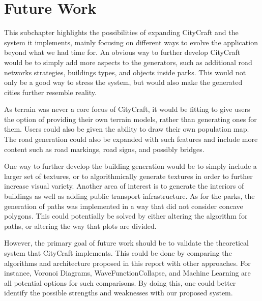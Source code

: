 \section{Future Work}
This subchapter highlights the possibilities of expanding CityCraft and the system it implements, mainly focusing on different ways to evolve the application beyond what we had time for.
An obvious way to further develop CityCraft would be to simply add more aspects to the generators, such as additional road networks strategies, buildings types, and objects inside parks.
This would not only be a good way to stress the system, but would also make the generated cities further resemble reality.
 
As terrain was never a core focus of CityCraft, it would be fitting to give users the option of providing their own terrain models, rather than generating ones for them. 
Users could also be given the ability to draw their own population map.
The road generation could also be expanded with such features and include more content such as road markings, road signs, and possibly bridges.
  
One way to further develop the building generation would be to simply include a larger set of textures, or to algorithmically generate textures in order to further increase visual variety.
Another area of interest is to generate the interiors of buildings as well as adding public transport infrastructure.
As for the parks, the generation of paths was implemented in a way that did not consider concave polygons.
This could potentially be solved by either altering the algorithm for paths, or altering the way that plots are divided.

However, the primary goal of future work should be to validate the theoretical system that CityCraft implements.
This could be done by comparing the algorithms and architecture proposed in this report with other approaches.
For instance, Voronoi Diagrams, WaveFunctionCollapse, and Machine Learning are all potential options for such comparisons.
By doing this, one could better identify the possible strengths and weaknesses with our proposed system.